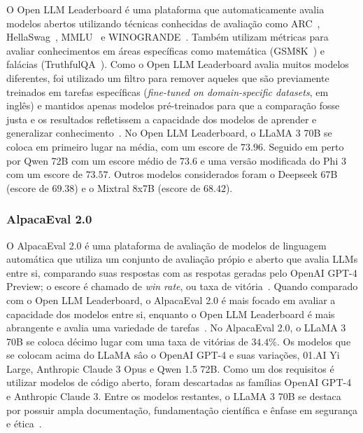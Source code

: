 \documentclass[journal]{IEEEtran}
\begin{document}
\noindent%
O Open LLM Leaderboard é uma plataforma que automaticamente avalia modelos abertos utilizando técnicas conhecidas de avaliação como ARC~\cite{clark2018think}, HellaSwag~\cite{zellers2019hellaswag}, MMLU~\cite{hendrycks2021measuring} e WINOGRANDE~\cite{DBLP:journals/corr/abs-1907-10641}.
Também utilizam métricas para avaliar conhecimentos em áreas específicas como matemática (GSM8K~\cite{DBLP:journals/corr/abs-2110-14168}) e falácias (TruthfulQA~\cite{lin2022truthfulqa}).
Como o Open LLM Leaderboard avalia muitos modelos diferentes, foi utilizado um filtro para remover aqueles que são previamente treinados em tarefas específicas (\textit{fine-tuned on domain-specific datasets}, em inglês) e mantidos apenas modelos pré-treinados para que a comparação fosse justa e os resultados refletissem a capacidade dos modelos de aprender e generalizar conhecimento~\cite{open-llm-leaderboard}.
No Open LLM Leaderboard, o LLaMA 3 70B se coloca em primeiro lugar na média, com um escore de $73.96$.
Seguido em perto por Qwen 72B com um escore médio de $73.6$ e uma versão modificada do Phi 3 com um escore de $73.57$.
Outros modelos considerados foram o Deepseek 67B (escore de $69.38$) e o Mixtral 8x7B (escore de $68.42$).

\subsubsection{AlpacaEval 2.0}

\noindent%
O AlpacaEval 2.0 é uma plataforma de avaliação de modelos de linguagem automática que utiliza um conjunto de avaliação própio e aberto que avalia LLMs entre si, comparando suas respostas com as respotas geradas pelo OpenAI GPT-4 Preview; o escore é chamado de \textit{win rate}, ou taxa de vitória~\cite{alpaca_eval}.
Quando comparado com o Open LLM Leaderboard, o AlpacaEval 2.0 é mais focado em avaliar a capacidade dos modelos entre si, enquanto o Open LLM Leaderboard é mais abrangente e avalia uma variedade de tarefas~\cite{alpaca_eval,open-llm-leaderboard}.
No AlpacaEval 2.0, o LLaMA 3 70B se coloca décimo lugar com uma taxa de vitórias de $34.4\%$.
Os modelos que se colocam acima do LLaMA sâo o OpenAI GPT-4 e suas variações, 01.AI Yi Large, Anthropic Claude 3 Opus e Qwen 1.5 72B.
Como um dos requisitos é utilizar modelos de código aberto, foram descartadas as famílias OpenAI GPT-4 e Anthropic Claude 3.
Entre os modelos restantes, o LLaMA 3 70B se destaca por possuir ampla documentação, fundamentação científica e ênfase em segurança e ética~\cite{meta2024llama3,llama3modelcard}.
\end{document}
